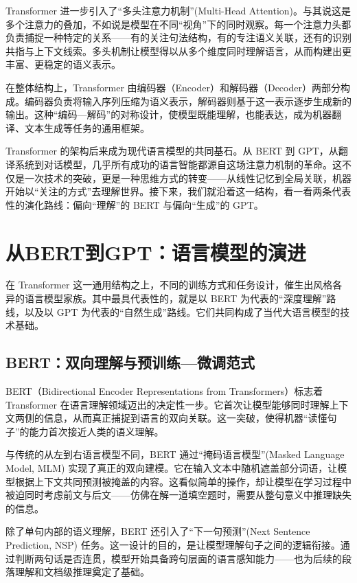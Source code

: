 Transformer 进一步引入了“多头注意力机制”(Multi-Head Attention)。与其说这是多个注意力的叠加，不如说是模型在不同“视角”下的同时观察。每一个注意力头都负责捕捉一种特定的关系——有的关注句法结构，有的专注语义关联，还有的识别共指与上下文线索。多头机制让模型得以从多个维度同时理解语言，从而构建出更丰富、更稳定的语义表示。

在整体结构上，Transformer 由编码器（Encoder）和解码器（Decoder）两部分构成。编码器负责将输入序列压缩为语义表示，解码器则基于这一表示逐步生成新的输出。这种“编码—解码”的对称设计，使模型既能理解，也能表达，成为机器翻译、文本生成等任务的通用框架。

Transformer 的架构后来成为现代语言模型的共同基石。从 BERT 到 GPT，从翻译系统到对话模型，几乎所有成功的语言智能都源自这场注意力机制的革命。这不仅是一次技术的突破，更是一种思维方式的转变——从线性记忆到全局关联，机器开始以“关注的方式”去理解世界。接下来，我们就沿着这一结构，看一看两条代表性的演化路线：偏向“理解”的 BERT 与偏向“生成”的 GPT。

\section{从BERT到GPT：语言模型的演进}

在 Transformer 这一通用结构之上，不同的训练方式和任务设计，催生出风格各异的语言模型家族。其中最具代表性的，就是以 BERT 为代表的“深度理解”路线，以及以 GPT 为代表的“自然生成”路线。它们共同构成了当代大语言模型的技术基础。

\subsection{BERT：双向理解与预训练—微调范式}

BERT（Bidirectional Encoder Representations from Transformers）标志着 Transformer 在语言理解领域迈出的决定性一步。它首次让模型能够同时理解上下文两侧的信息，从而真正捕捉到语言的双向关联。这一突破，使得机器“读懂句子”的能力首次接近人类的语义理解。

与传统的从左到右语言模型不同，BERT 通过“掩码语言模型”(Masked Language Model, MLM) 实现了真正的双向建模。它在输入文本中随机遮盖部分词语，让模型根据上下文共同预测被掩盖的内容。这看似简单的操作，却让模型在学习过程中被迫同时考虑前文与后文——仿佛在解一道填空题时，需要从整句意义中推理缺失的信息。

除了单句内部的语义理解，BERT 还引入了“下一句预测”(Next Sentence Prediction, NSP) 任务。这一设计的目的，是让模型理解句子之间的逻辑衔接。通过判断两句话是否连贯，模型开始具备跨句层面的语言感知能力——也为后续的段落理解和文档级推理奠定了基础。

